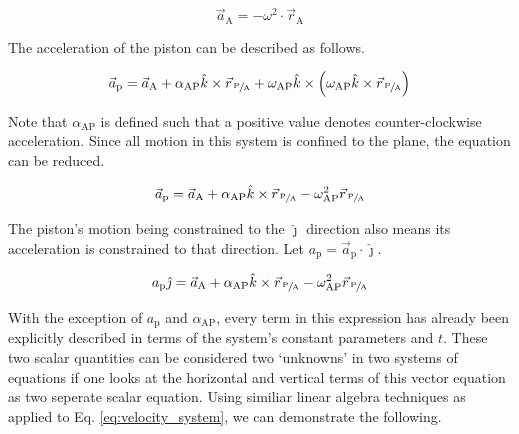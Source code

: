 \documentclass[nofoot,pdf-a,balance,colorlinks,upint,subscriptcorrection,varvw,mathalfa=cal=boondoxo]{asmeconf}
\begin{document}
    \begin{equation}
        \vec{a}_{\textrm{A}} = - \omega^2\cdot\vec{r}_{\textrm{A}}
    \end{equation}

    The acceleration of the piston can be described as follows.


    \begin{equation}
        \vec{a}_{\textrm{p}} = \vec{a}_{\textrm{A}} + \alpha_{\textrm{AP}}\hat{k} \times \vec{r}_{\,\sfrac{\textrm{P}}{\textrm{A}}} + \omega_{\textrm{AP}}\hat{k}\times \left(\omega_{\textrm{AP}}\hat{k}\times \vec{r}_{\,\sfrac{\textrm{P}}{\textrm{A}}}\right)
    \end{equation}

    Note that $\alpha_{\textrm{AP}}$ is defined such that a positive value denotes counter-clockwise acceleration. Since all motion in this system is confined to the plane, the equation can be reduced.

    \begin{equation}\label{eq:piston_accel}
        \vec{a}_{\textrm{p}} = \vec{a}_{\textrm{A}} + \alpha_{\textrm{AP}}\hat{k} \times \vec{r}_{\,\sfrac{\textrm{P}}{\textrm{A}}} - \omega_{\textrm{AP}}^2 \vec{r}_{\,\sfrac{\textrm{P}}{\textrm{A}}}
    \end{equation}

    The piston's motion being constrained to the $\hat{\jmath}$ direction also means its acceleration is constrained to that direction. Let $a_{\textrm{p}} = \vec{a}_{\textrm{p}}\cdot\hat{\jmath}$.

    \begin{equation}
         a_{\textrm{p}}\hat{\jmath}= \vec{a}_{\textrm{A}} + \alpha_{\textrm{AP}}\hat{k} \times \vec{r}_{\,\sfrac{\textrm{P}}{\textrm{A}}} - \omega_{\textrm{AP}}^2 \vec{r}_{\,\sfrac{\textrm{P}}{\textrm{A}}}
    \end{equation}

    With the exception of $a_{\textrm{p}}$ and $\alpha_{\textrm{AP}}$, every term in this expression has already been explicitly described in terms of the system's constant parameters and $t$. These two scalar quantities can be considered two `unknowns' in two systems of equations if one looks at the horizontal and vertical terms of this vector equation as two seperate scalar equation. Using similiar linear algebra techniques as applied to Eq. \eqref{eq:velocity_system}, we can demonstrate the following.

    
\end{document}
